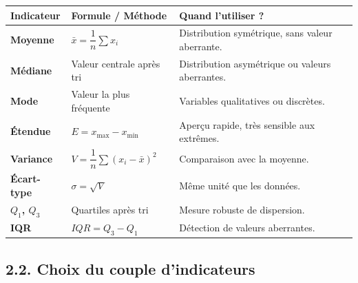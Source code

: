 \documentclass[11pt,a4paper]{article}
\begin{document}
\begin{rappel}[title={\textbf{Fiche de synthèse — Tous les indicateurs}}]
\begin{tabularx}{\linewidth}{|p{2.6cm}|X|p{4.2cm}|}
\hline
\rowcolor{soft}
\textbf{Indicateur} & \textbf{Formule / Méthode} & \textbf{Quand l'utiliser ?} \\ \hline
\textbf{Moyenne} & \(\bar{x} = \dfrac{1}{n}\sum x_i\) & Distribution symétrique, sans valeur aberrante. \\ \hline
\textbf{Médiane} & Valeur centrale après tri & Distribution asymétrique ou valeurs aberrantes. \\ \hline
\textbf{Mode} & Valeur la plus fréquente & Variables qualitatives ou discrètes. \\ \hline
\textbf{Étendue} & \(E = x_{\max} - x_{\min}\) & Aperçu rapide, très sensible aux extrêmes. \\ \hline
\textbf{Variance} & \(V = \dfrac{1}{n}\sum (x_i - \bar{x})^2\) & Comparaison avec la moyenne. \\ \hline
\textbf{Écart-type} & \(\sigma = \sqrt{V}\) & Même unité que les données. \\ \hline
\textbf{\(Q_1\), \(Q_3\)} & Quartiles après tri & Mesure robuste de dispersion. \\ \hline
\textbf{IQR} & \(IQR = Q_3 - Q_1\) & Détection de valeurs aberrantes. \\ \hline
\end{tabularx}
\end{rappel}

\subsection*{2.2. Choix du couple d'indicateurs}
\end{document}
